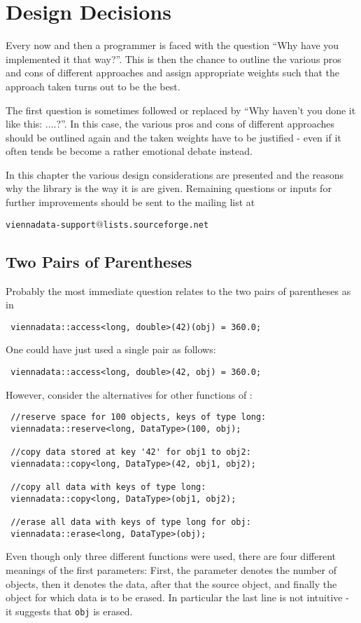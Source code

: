 \chapter{Design Decisions} \label{chap:design}



Every now and then a programmer is faced with the question ``Why have you implemented it that way?''.
This is then the chance to outline the various pros and cons of different approaches and assign appropriate weights such that the approach taken turns out to be the best.

The first question is sometimes followed or replaced by ``Why haven't you done it like this: ....?''.
In this case, the various pros and cons of different approaches should be outlined again and the taken weights have to be justified - even if it often tends be become a rather emotional debate instead.

In this chapter the various design considerations are presented and the reasons why the library is the way it is are given.
Remaining questions or inputs for further improvements should be sent to the mailing list at
\begin{center}
\texttt{viennadata-support$@$lists.sourceforge.net}
\end{center}

\section{Two Pairs of Parentheses}
Probably the most immediate question relates to the two pairs of parentheses as in
\begin{lstlisting}
 viennadata::access<long, double>(42)(obj) = 360.0;
\end{lstlisting}
One could have just used a single pair as follows:
\begin{lstlisting}
 viennadata::access<long, double>(42, obj) = 360.0;
\end{lstlisting}
However, consider the alternatives for other functions of {\ViennaData}:
\begin{lstlisting}
 //reserve space for 100 objects, keys of type long:
 viennadata::reserve<long, DataType>(100, obj);

 //copy data stored at key '42' for obj1 to obj2:
 viennadata::copy<long, DataType>(42, obj1, obj2);

 //copy all data with keys of type long:
 viennadata::copy<long, DataType>(obj1, obj2);

 //erase all data with keys of type long for obj:
 viennadata::erase<long, DataType>(obj);
\end{lstlisting}
Even though only three different functions were used, there are four different meanings of the first parameters:
First, the parameter denotes the number of objects, then it denotes the data, after that the source object, and finally the object for which data is to be erased.
In particular the last line is not intuitive - it suggests that \lstinline|obj| is erased.

